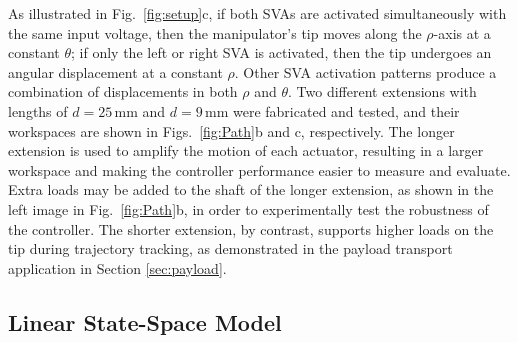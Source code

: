 As illustrated in Fig.~\ref{fig:setup}c, if both SVAs are activated simultaneously with the same input voltage, then the manipulator's tip moves along the $\rho$-axis at a constant $\theta$; if only the left or right SVA is activated, then the tip undergoes an angular displacement at a constant $\rho$. Other SVA activation patterns produce a combination of displacements in both $\rho$ and $\theta$. 
Two different extensions with lengths of $d = 25$\,mm and $d=9$\,mm were fabricated and tested, and their workspaces are shown in  Figs.~\ref{fig:Path}b and c, respectively. The longer extension is used to amplify the motion of each actuator, resulting in a larger workspace and making the controller performance easier to measure and evaluate. Extra loads may be added to the shaft of the longer extension, as shown in the left image in Fig.~\ref{fig:Path}b, in order to experimentally test the robustness of the controller. The shorter extension, by contrast, supports higher loads on the tip during trajectory tracking, as demonstrated in the payload transport application in Section \ref{sec:payload}.


\subsection{Linear State-Space Model}

